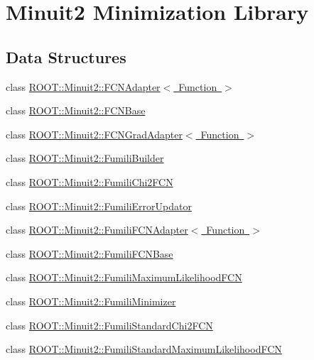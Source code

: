 \hypertarget{group__Minuit}{}\section{Minuit2 Minimization Library}
\label{group__Minuit}
\subsection*{Data Structures}
\begin{DoxyCompactItemize}
\item 
class \mbox{\hyperlink{classROOT_1_1Minuit2_1_1FCNAdapter}{R\+O\+O\+T\+::\+Minuit2\+::\+F\+C\+N\+Adapter$<$ Function $>$}}
\item 
class \mbox{\hyperlink{classROOT_1_1Minuit2_1_1FCNBase}{R\+O\+O\+T\+::\+Minuit2\+::\+F\+C\+N\+Base}}
\item 
class \mbox{\hyperlink{classROOT_1_1Minuit2_1_1FCNGradAdapter}{R\+O\+O\+T\+::\+Minuit2\+::\+F\+C\+N\+Grad\+Adapter$<$ Function $>$}}
\item 
class \mbox{\hyperlink{classROOT_1_1Minuit2_1_1FumiliBuilder}{R\+O\+O\+T\+::\+Minuit2\+::\+Fumili\+Builder}}
\item 
class \mbox{\hyperlink{classROOT_1_1Minuit2_1_1FumiliChi2FCN}{R\+O\+O\+T\+::\+Minuit2\+::\+Fumili\+Chi2\+F\+CN}}
\item 
class \mbox{\hyperlink{classROOT_1_1Minuit2_1_1FumiliErrorUpdator}{R\+O\+O\+T\+::\+Minuit2\+::\+Fumili\+Error\+Updator}}
\item 
class \mbox{\hyperlink{classROOT_1_1Minuit2_1_1FumiliFCNAdapter}{R\+O\+O\+T\+::\+Minuit2\+::\+Fumili\+F\+C\+N\+Adapter$<$ Function $>$}}
\item 
class \mbox{\hyperlink{classROOT_1_1Minuit2_1_1FumiliFCNBase}{R\+O\+O\+T\+::\+Minuit2\+::\+Fumili\+F\+C\+N\+Base}}
\item 
class \mbox{\hyperlink{classROOT_1_1Minuit2_1_1FumiliMaximumLikelihoodFCN}{R\+O\+O\+T\+::\+Minuit2\+::\+Fumili\+Maximum\+Likelihood\+F\+CN}}
\item 
class \mbox{\hyperlink{classROOT_1_1Minuit2_1_1FumiliMinimizer}{R\+O\+O\+T\+::\+Minuit2\+::\+Fumili\+Minimizer}}
\item 
class \mbox{\hyperlink{classROOT_1_1Minuit2_1_1FumiliStandardChi2FCN}{R\+O\+O\+T\+::\+Minuit2\+::\+Fumili\+Standard\+Chi2\+F\+CN}}
\item 
class \mbox{\hyperlink{classROOT_1_1Minuit2_1_1FumiliStandardMaximumLikelihoodFCN}{R\+O\+O\+T\+::\+Minuit2\+::\+Fumili\+Standard\+Maximum\+Likelihood\+F\+CN}}

\end{DoxyCompactItemize}
